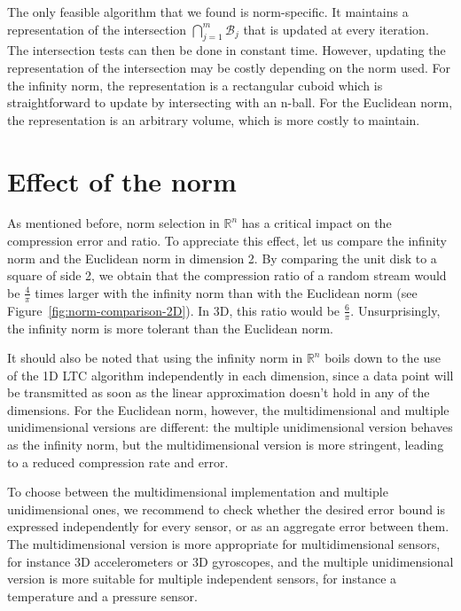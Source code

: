 The only feasible algorithm that we found is norm-specific. It
maintains a representation of the intersection
$\bigcap_{j=1}^{m}{\mathcal{B}_j}$ that is updated at every iteration.
The intersection tests can then be done in constant time. However,
updating the representation of the intersection may be costly
depending on the norm used. For the infinity norm, the representation
is a rectangular cuboid which is straightforward to update by
intersecting with an n-ball.
For the Euclidean norm, the representation is an arbitrary volume,
which is more costly to maintain.

\section{Effect of the norm}
\label{sec:effect-norm}

As mentioned before, norm selection in $\mathbb{R}^n$ has a critical impact on
the compression error and ratio. To appreciate this effect, let us compare the
infinity norm and the Euclidean norm in dimension 2. By comparing the unit disk
to a square of side 2, we obtain that the compression ratio of a random stream
would be $\frac{4}{\pi}$ times larger with the infinity norm than with the
Euclidean norm (see Figure~\ref{fig:norm-comparison-2D}). In 3D, this ratio
would be $\frac{6}{\pi}$. Unsurprisingly, the infinity norm is more tolerant
than the Euclidean norm.

It should also be noted that using the infinity norm in $\mathbb{R}^n$ boils
down to the use of the 1D LTC algorithm independently in each dimension, since
a data point will be transmitted as soon as the linear approximation doesn't
hold in any of the dimensions. For the Euclidean norm, however, the
multidimensional and multiple unidimensional versions are different: the
multiple unidimensional version behaves as the infinity norm, but the
multidimensional version is more stringent, leading to a reduced compression
rate and error.

To choose between the multidimensional implementation and multiple
unidimensional ones, we recommend to check whether the desired error bound is
expressed independently for every sensor, or as an aggregate error between them.
The multidimensional version is more appropriate for multidimensional sensors,
for instance 3D accelerometers or 3D gyroscopes, and the multiple unidimensional
version is more suitable for multiple independent sensors, for instance a
temperature and a pressure sensor.

